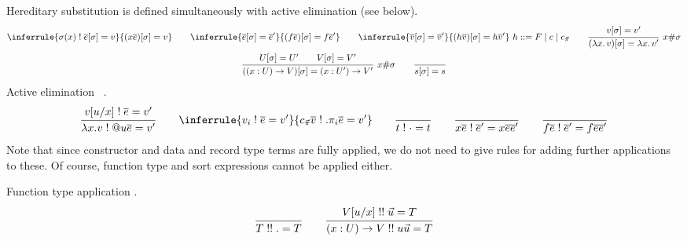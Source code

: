 \documentclass[acmlarge,fleqn]{acmart}\settopmatter{}
\begin{document}
Hereditary substitution 
is defined simultaneously with active elimination (see below).
\begin{gather*}
\inferrule
  {\sigma(x) \bang \overline{e}[\sigma] = v}
  {(x \overline{e})[\sigma] = v}
\qquad
\inferrule
  {\overline{e}[\sigma] = \overline{e}'}
  {(f \overline{e})[\sigma] = f \overline{e}'}
\qquad
\inferrule
  {\overline{v}[\sigma] = \overline{v}'}
  {(h \overline{v})[\sigma] = h \overline{v}'}
  \ h ::= F \mid c \mid \cpi
\qquad
\rux{v[\sigma] = v'
  }{(\lam x v)[\sigma] = \lam x v'
  }{x \# \sigma}
\\
\rux{U[\sigma] = U' \qquad
     V[\sigma] = V'
   }{(\piT x U V)[\sigma] = \piT x {U'}{V'}
   }{x \# \sigma}
\qquad
\ru{}{s[\sigma] = s}
\end{gather*}
Active elimination \ .
\begin{gather*}
\ru
  { v[u/x] \bang \overline{e} = v'}
  {\lambda x.v \bang @u \overline{e} = v'}
\qquad
\inferrule
  {v_i \bang \overline{e} = v'}
  {\cpi \overline{v} \bang .\pi_i \overline{e} = v'}
\qquad
\ru{}{t \bang \cdot = t}
\qquad
\ru{}{x \overline{e} \bang \overline{e}' = x \overline{e}
  \overline{e}'}
\qquad
\ru{}{f \overline{e} \bang \overline{e}' = f \overline{e} \overline{e}'}
\end{gather*}
Note that since constructor and data and record type terms are fully
applied, we do not need to give rules for adding further applications
to these.  Of course, function type and sort expressions cannot be applied either.


Function type application .
\[
  \ru{}{T \twobang . = T}
\qquad
  \ru{\subst u x V \twobang \vec u = T
    }{\funT x U V \twobang u \vec u = T}
\]

\end{document}
